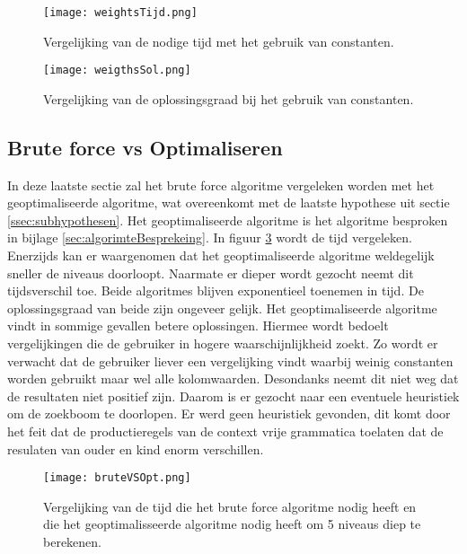 \documentclass[Main.tex]{subfiles}
\begin{document}
\begin{figure}[!htb]
\centering
\texttt{[image: weightsTijd.png]} %
\caption{Vergelijking van de nodige tijd met het gebruik van constanten.} \label{fig:gewichtenTijd}
\end{figure}

\begin{figure}[!htb]
\centering
\texttt{[image: weigthsSol.png]} %
\caption{Vergelijking van de oplossingsgraad bij het gebruik van constanten.} \label{fig:gewichtenOplossingsgraad}
\end{figure}

\subsection{Brute force vs Optimaliseren}
In deze laatste sectie zal het brute force algoritme vergeleken worden met het geoptimaliseerde algoritme, wat overeenkomt met de laatste hypothese uit sectie \ref{ssec:subhypothesen}. Het geoptimaliseerde algoritme is het algoritme besproken in bijlage \ref{sec:algorimteBesprekeing}. In figuur \ref{fig:brutevsopttijd} wordt de tijd vergeleken. Enerzijds kan er waargenomen dat het geoptimaliseerde algoritme weldegelijk sneller de niveaus doorloopt. Naarmate er dieper wordt gezocht neemt dit tijdsverschil toe. Beide algoritmes blijven exponentieel toenemen in tijd. De oplossingsgraad van beide zijn ongeveer gelijk. Het geoptimaliseerde algoritme vindt in sommige gevallen betere oplossingen. Hiermee wordt bedoelt vergelijkingen die de gebruiker in hogere waarschijnlijkheid zoekt. Zo wordt er verwacht dat de gebruiker liever een vergelijking vindt waarbij weinig constanten worden gebruikt maar wel alle kolomwaarden. Desondanks neemt dit niet weg dat de resultaten niet positief zijn. Daarom is er gezocht naar een eventuele heuristiek om de zoekboom te doorlopen. Er werd geen heuristiek gevonden, dit komt door het feit dat de productieregels van de context vrije grammatica toelaten dat de resulaten van ouder en kind enorm verschillen.


\begin{figure}[!htb]
\centering
\texttt{[image: bruteVSOpt.png]} %
\caption{Vergelijking van de tijd die het brute force algoritme nodig heeft en die het geoptimalisseerde algoritme nodig heeft om 5 niveaus diep te berekenen.} \label{fig:brutevsopttijd}
\end{figure}
\end{document}
